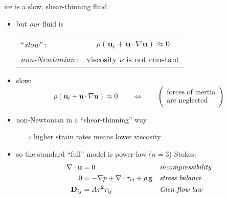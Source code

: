 \begin{frame}{ice is a slow, shear-thinning fluid}

\begin{itemize}
\item but \emph{our} fluid is

\smallskip
  \begin{tabular}{lc}
  ``\emph{slow}''\,: & $\rho \left(\mathbf{u}_t + \mathbf{u}\cdot\nabla \mathbf{u}\right) \approx 0$ \\
  \emph{non-Newtonian}\,: & viscosity $\nu$ is not constant
  \end{tabular}

\bigskip
\item slow:
  $$\rho \left(\mathbf{u}_t + \mathbf{u}\cdot\nabla \mathbf{u}\right) \approx 0 \qquad \iff \qquad \begin{pmatrix} \text{forces of inertia} \\ \text{are neglected} \end{pmatrix}$$

\medskip
\item non-Newtonian in a ``shear-thinning'' way
  \begin{itemize}
  \item[$\circ$] higher strain rates means lower viscosity
  \end{itemize}

\bigskip
\item so the standard ``full'' model is power-law ($n=3$) \alert{Stokes}:
\begin{align*}
\nabla \cdot \mathbf{u} &= 0 &&\text{\emph{incompressibility}} \\
0 &= - \nabla p + \nabla \cdot \tau_{ij} + \rho\, \mathbf{g} &&\text{\emph{stress balance}} \\
\mathbf{D}_{ij} &= A \tau^2 \tau_{ij} &&\text{\emph{Glen flow law}}
\end{align*}

\end{itemize}
\end{frame}


